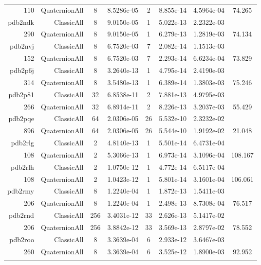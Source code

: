\begin{xltabular}{\textwidth}{r|rcS[table-format=1.4e+2]cS[table-format=1.3e+2]S[table-format=1.4e+2]S[table-format=-1.3]}
110 & QuaternionAll & 8 & 8.5286e-05 & 2 & 8.855e-14 & 4.5964e-04 & 74.265\\  \addlinespace
pdb2ndk & ClassicAll & 8 & 9.0150e-05 & 1 & 5.022e-13 & 2.2322e-03 & \\
290 & QuaternionAll & 8 & 9.0150e-05 & 1 & 6.279e-13 & 1.2819e-03 & 74.134\\  \addlinespace
pdb2nvj & ClassicAll & 8 & 6.7520e-03 & 7 & 2.082e-14 & 1.1513e-03 & \\
152 & QuaternionAll & 8 & 6.7520e-03 & 7 & 2.293e-14 & 6.6234e-04 & 73.829\\  \addlinespace
pdb2p6j & ClassicAll & 8 & 3.2640e-13 & 1 & 4.795e-14 & 2.4190e-03 & \\
314 & QuaternionAll & 8 & 3.5480e-13 & 1 & 6.389e-14 & 1.3803e-03 & 75.246\\  \addlinespace
pdb2p81 & ClassicAll & 32 & 6.8538e-11 & 2 & 7.881e-13 & 4.9795e-03 & \\
266 & QuaternionAll & 32 & 6.8914e-11 & 2 & 8.226e-13 & 3.2037e-03 & 55.429\\  \addlinespace
pdb2pqe & ClassicAll & 64 & 2.0306e-05 & 26 & 5.532e-10 & 2.3232e-02 & \\
896 & QuaternionAll & 64 & 2.0306e-05 & 26 & 5.544e-10 & 1.9192e-02 & 21.048\\  \addlinespace
pdb2rlg & ClassicAll & 2 & 4.8140e-13 & 1 & 5.501e-14 & 6.4731e-04 & \\
108 & QuaternionAll & 2 & 5.3066e-13 & 1 & 6.973e-14 & 3.1096e-04 & 108.167\\  \addlinespace
pdb2rlh & ClassicAll & 2 & 1.0750e-12 & 1 & 4.772e-14 & 6.5117e-04 & \\
108 & QuaternionAll & 2 & 1.0423e-12 & 1 & 5.801e-14 & 3.1601e-04 & 106.061\\  \addlinespace
pdb2rmy & ClassicAll & 8 & 1.2240e-04 & 1 & 1.872e-13 & 1.5411e-03 & \\
206 & QuaternionAll & 8 & 1.2240e-04 & 1 & 2.498e-13 & 8.7308e-04 & 76.517\\  \addlinespace
pdb2rnd & ClassicAll & 256 & 3.4031e-12 & 33 & 2.626e-13 & 5.1417e-02 & \\
206 & QuaternionAll & 256 & 3.8842e-12 & 33 & 3.569e-13 & 2.8797e-02 & 78.552\\  \addlinespace
pdb2roo & ClassicAll & 8 & 3.3639e-04 & 6 & 2.933e-12 & 3.6467e-03 & \\
260 & QuaternionAll & 8 & 3.3639e-04 & 6 & 3.525e-12 & 1.8900e-03 & 92.952\\  \addlinespace

\end{xltabular}
